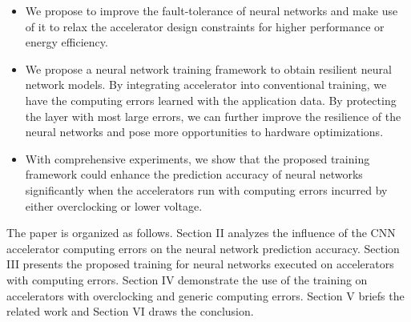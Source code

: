 \begin{itemize}
	\item We propose to improve the fault-tolerance of neural networks and make use of it to relax 
		the accelerator design constraints for higher performance or energy efficiency.

	\item We propose a neural network training framework to obtain resilient neural network models. 
		By integrating accelerator into conventional training, we have the computing errors 
		learned with the application data. By protecting the layer with most large errors, 
		we can further improve the resilience of the neural networks and pose more 
		opportunities to hardware optimizations.

	\item With comprehensive experiments, we show that the proposed training framework 
		could enhance the prediction accuracy of neural networks significantly 
		when the accelerators run with computing errors incurred by either 
		overclocking or lower voltage.
\end{itemize}
The paper is organized as follows. Section II analyzes the influence of 
the CNN accelerator computing errors on the neural network prediction accuracy. 
Section III presents the proposed training for neural networks executed on accelerators with computing errors.
Section IV demonstrate the use of the training on accelerators with overclocking and generic computing errors. 
Section V briefs the related work and Section VI draws the conclusion. 


